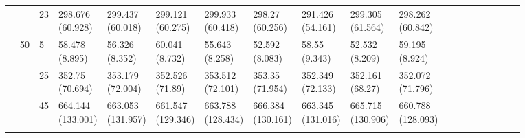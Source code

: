 \documentclass[12pt,a4paper]{article}
\begin{document}
\begin{landscape}
\begin{longtable}{lllllllllllrrrrrrrr}
 &  & 23 & \makecell{298.676 \\ (60.928)} & \makecell{299.437 \\ (60.018)} & \makecell{299.121 \\ (60.275)} & \makecell{299.933 \\ (60.418)} & \makecell{298.27 \\ (60.256)} & \makecell{291.426 \\ (54.161)} & \makecell{299.305 \\ (61.564)} & \makecell{298.262 \\ (60.842)} \\
\cline{2-11}
 & \multirow[t]{3}{*}{50} & 5 & \makecell{58.478 \\ (8.895)} & \makecell{56.326 \\ (8.352)} & \makecell{60.041 \\ (8.732)} & \makecell{55.643 \\ (8.258)} & \makecell{52.592 \\ (8.083)} & \makecell{58.55 \\ (9.343)} & \makecell{52.532 \\ (8.209)} & \makecell{59.195 \\ (8.924)} \\
 &  & 25 & \makecell{352.75 \\ (70.694)} & \makecell{353.179 \\ (72.004)} & \makecell{352.526 \\ (71.89)} & \makecell{353.512 \\ (72.101)} & \makecell{353.35 \\ (71.954)} & \makecell{352.349 \\ (72.133)} & \makecell{352.161 \\ (68.27)} & \makecell{352.072 \\ (71.796)} \\
 &  & 45 & \makecell{664.144 \\ (133.001)} & \makecell{663.053 \\ (131.957)} & \makecell{661.547 \\ (129.346)} & \makecell{663.788 \\ (128.434)} & \makecell{666.384 \\ (130.161)} & \makecell{663.345 \\ (131.016)} & \makecell{665.715 \\ (130.906)} & \makecell{660.788 \\ (128.093)} \\
\cline{1-11} \cline{2-11}
\bottomrule
\label{tab:PredSim}
\end{longtable}
\end{landscape}
\end{document}
